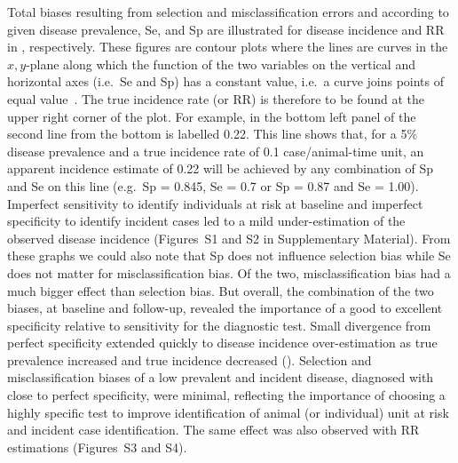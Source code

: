 Total biases resulting from selection and misclassification errors and according
to given disease prevalence, Se, and Sp are illustrated for disease incidence
and RR in , respectively.
These figures are contour plots where the lines are curves in the \(x, y\)-plane
along which the function of the two variables on the vertical and horizontal
axes (i.e.\ Se and Sp) has a constant value, i.e.\ a curve joins points of equal
value~\citep{courant_1996}.
The true incidence rate (or RR) is therefore to be found at the upper right
corner of the plot.
For example, in the bottom left panel of  the second
line from the bottom is labelled 0.22.
This line shows that, for a 5\% disease prevalence and a true incidence rate of
0.1 case/animal-time unit, an apparent incidence estimate of 0.22 will be
achieved by any combination of Sp and Se on this line (e.g.\ Sp = 0.845, Se =
0.7 or Sp = 0.87 and Se = 1.00). 
Imperfect sensitivity to identify individuals at risk at baseline and imperfect
specificity to identify incident cases led to a mild under-estimation of the
observed disease incidence (Figures~S1 and S2 in Supplementary Material).
From these graphs we could also note that Sp does not influence selection bias
while Se does not matter for misclassification bias.
Of the two, misclassification bias had a much bigger effect than selection bias.
But overall, the combination of the two biases, at baseline and follow-up,
revealed the importance of a good to excellent specificity relative to
sensitivity for the diagnostic test.
Small divergence from perfect specificity extended quickly to disease incidence
over-estimation as true prevalence increased and true incidence decreased
().
Selection and misclassification biases of a low prevalent and incident disease,
diagnosed with close to perfect specificity, were minimal, reflecting the
importance of choosing a highly specific test to improve identification of
animal (or individual) unit at risk and incident case identification.
The same effect was also observed with RR estimations (Figures~S3 and S4).

